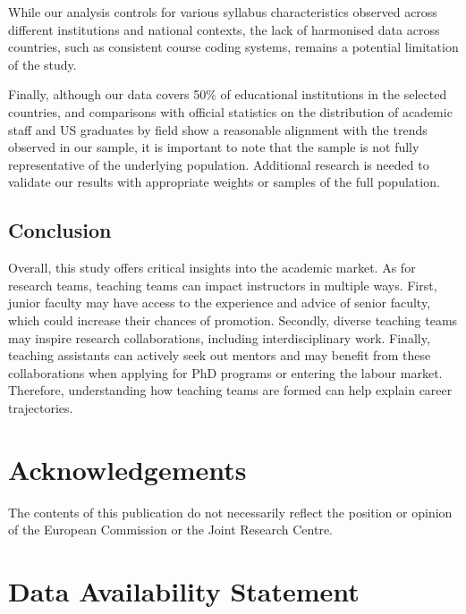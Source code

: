 \documentclass[
  british,
  11pt,
]{article}
\begin{document}
While our analysis controls for various syllabus characteristics observed across different institutions and national contexts, the lack of harmonised data across countries, such as consistent course coding systems, remains a potential limitation of the study.

Finally, although our data covers 50\% of educational institutions in the selected countries, and comparisons with official statistics on the distribution of academic staff and US graduates by field show a reasonable alignment with the trends observed in our sample, it is important to note that the sample is not fully representative of the underlying population. Additional research is needed to validate our results with appropriate weights or samples of the full population.

\subsection{Conclusion}\label{conclusion}

Overall, this study offers critical insights into the academic market. As for research teams, teaching teams can impact instructors in multiple ways. First, junior faculty may have access to the experience and advice of senior faculty, which could increase their chances of promotion. Secondly, diverse teaching teams may inspire research collaborations, including interdisciplinary work. Finally, teaching assistants can actively seek out mentors and may benefit from these collaborations when applying for PhD programs or entering the labour market. Therefore, understanding how teaching teams are formed can help explain career trajectories.

\clearpage
\processdelayedfloats
\clearpage

\section*{Acknowledgements}\label{acknowledgements}

The contents of this publication do not necessarily reflect the position or opinion of the European Commission or the Joint Research Centre.

\section*{Data Availability Statement}\label{data-availability-statement}
\end{document}
